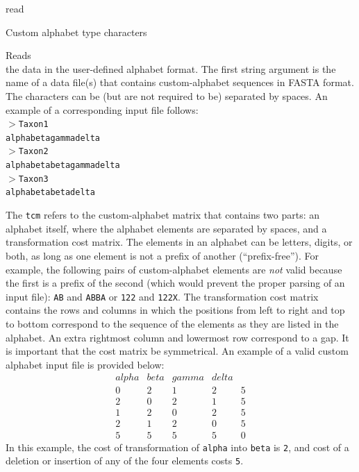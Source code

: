 \begin{command}{read}{}
\begin{arguments}
\begin{argumentgroup}{Custom alphabet type characters}
{Reads \\ the data in the user-defined alphabet format. The first string argument is
the name of a data file(s) that contains custom-alphabet sequences in FASTA format. 
The characters can be (but are not required to be) separated by spaces.
An example of a corresponding input file follows:\\

\texttt{$>$Taxon1\\
\indent alphabetagammadelta\\
\indent $>$Taxon2\\
\indent alphabetabetagammadelta\\
\indent $>$Taxon3\\
\indent alphabetabetadelta\\}

The \texttt{tcm} refers to the custom-alphabet matrix that contains two parts:
an alphabet itself, where the alphabet elements are separated by spaces, and a
transformation cost matrix. The elements in an alphabet can be letters, digits, or
both, as long as one element is not a prefix of another (``prefix-free''). For
example, the following pairs of custom-alphabet elements are \emph{not} valid
because the first is a prefix of the second (which would prevent the proper parsing of
an input file): \texttt{AB} and \texttt{ABBA} or \texttt{122} and \texttt{122X}.
The transformation cost matrix contains the rows and columns in which the
positions from left to right and top to bottom correspond to the sequence of the
elements as they are listed in the alphabet. An extra rightmost column and lowermost
row correspond to a gap. It is important that the cost matrix be symmetrical. An example 
of a valid custom alphabet input file is provided below:
\\
\begin{equation*}
\begin{array}{lllll}
alpha & beta & gamma & delta &  \\
0 &   2 &  1 &   2 &   5 \\
2 &   0 &  2 &   1 &   5 \\
1 &   2 &  0 &   2 &   5 \\
2 &   1 &  2 &   0 &   5 \\
5 &   5 &  5 &   5 &   0
\end{array}
\end{equation*} 
In this example, the cost of transformation of \texttt{alpha} into \texttt{beta} is \texttt{2},
and cost of a deletion or insertion of any of the four elements costs \texttt{5}.

}
\end{argumentgroup}
\end{arguments}
\end{command}
